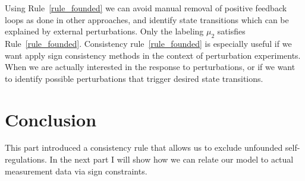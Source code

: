 Using Rule~\ref{rule_founded} we can avoid manual removal of positive
 feedback loops as done in other approaches, and identify state transitions which can be explained by external perturbations.
Only the labeling $\mu_2$ satisfies Rule~\ref{rule_founded}.
Consistency rule~\ref{rule_founded} is especially useful if we want apply sign consistency methods in the context of perturbation experiments.
When we are actually interested in the response to perturbations,
or if we want to identify possible perturbations that trigger desired state transitions.

\section*{Conclusion}

This part introduced a consistency rule that allows us to exclude unfounded self-regulations.
In the next part I will show how we can relate our model to actual measurement data via sign constraints.
